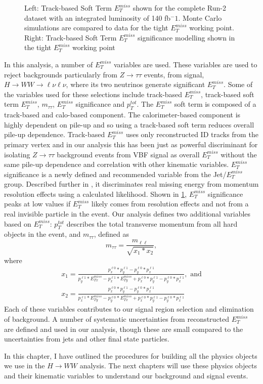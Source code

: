 \begin{figure}[!h]
\begin{minipage}[b]{0.45\textwidth}
  \end{minipage}
    \caption{ Left: Track-based Soft Term $E_T^{miss}$ shown for the complete Run-2 dataset with an integrated luminosity of 140 fb$^-1$. Monte Carlo simulations are compared to data for the tight $E_T^{miss}$ working point. Right: Track-based Soft Term $E_T^{miss}$ significance modelling shown in the tight $E_T^{miss}$ working point  \cite{JETEtmiss}}
    \label{fig:METPerf}
\end{figure}

In this analysis, a number of $E_T^{miss}$ variables are used. These variables are used to reject backgrounds particularly from $Z\rightarrow \tau\tau$ events, from signal, $H\rightarrow WW\rightarrow \ell\nu\ell\nu$, where its two neutrinos generate significant $E_T^{miss}$. Some of the variables used for these selections include track-based $E_T^{miss}$, track-based soft term $E_T^{miss}$, $m_{\tau\tau}$, $E_T^{miss}$ significance and $p_T^{tot}$. The $E_T^{miss}$ soft term is composed of a track-based and calo-based component. The calorimeter-based component is highly dependent on pile-up and so using a track-based soft term reduces overall pile-up dependence. Track-based $E_T^{miss}$ uses only reconstructed ID tracks from the primary vertex and in our analysis this has been just as powerful discriminant for isolating $Z\rightarrow \tau\tau$ background events from VBF signal as overall $E_T^{miss}$ without the same pile-up dependence and correlation with other kinematic variables. $E_T^{miss}$ significance is a newly defined and recommended variable from the Jet/$E_T^{miss}$group. Described further in \cite{METSig}, it discriminates real missing energy from momentum resolution effects using a calculated likelihood. Shown in \ref{fig:METPerf},  $E_T^{miss}$ significance peaks at low values if $E_T^{miss}$ likely comes from resolution effects and not from a real invisible particle in the event. Our analysis defines two additional variables based on $E_T^{miss}$: $p_T^{tot}$ describes the total transverse momentum from all hard objects in the event, and $m_{\tau\tau}$, defined as
\begin{equation}
m_{\tau\tau} = \frac{m_{\ell\ell}}{\sqrt{x_1*x_2}},
\end{equation}
where 
\begin{equation}
\begin{split}
x_1 = \frac{p^{\ell0}_x*p^{\ell1}_y-p^{\ell0}_y*p^{\ell1}_x}{p^{\ell1}_y*E_{Tx}^{miss}-p^{\ell1}_x*E_{Ty}^{miss}+p^{\ell0}_x*p^{\ell1}_y-p^{\ell0}_y*p^{\ell1}_x}, \text{ and} \\
x_2 = \frac{p^{\ell0}_x*p^{\ell1}_y-p^{\ell0}_y*p^{\ell1}_x}{p^{\ell1}_x*E_{Ty}^{miss}-p^{\ell0}_y*E_{Tx}^{miss}+p^{\ell0}_x*p^{\ell1}_y-p^{\ell0}_y*p^{\ell1}_x}
\end{split}
\end{equation}
Each of these variables contributes to our signal region selection and elimination of background. A number of systematic uncertainties from reconstructed $E_T^{miss}$ are defined and used in our analysis, though these are small compared to the uncertainties from jets and other final state particles.

In this chapter, I have outlined the procedures for building all the physics objects we use in the $H\rightarrow WW$ analysis. The next chapters will use these physics objects and their kinematic variables to understand our background and signal events.
 
